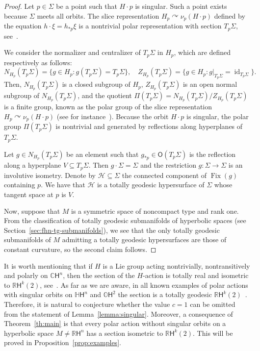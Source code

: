 \documentclass[12pt, a4paper]{amsart}
\newcommand{\s}{\mathsf}
\newcommand{\R}{\mathbb{R}}
\newcommand{\C}{\mathbb{C}}
\renewcommand{\H}{\mathbb{H}}
\renewcommand{\O}{\mathbb{O}}
\theoremstyle{definition}
\begin{document}
\begin{proof}
    Let $p\in \Sigma$ be a point such that $H\cdot p$ is singular.
    Such a point exists because $\Sigma$ meets all orbits.
    The slice representation $H_p \curvearrowright \nu_p (H\cdot p)$ defined 
    by the equation $h\cdot\xi=h_{*p}\xi$
    is a nontrivial polar representation with section $T_p\Sigma$, see~\cite{BerndtConsoleOlmos16}.

    We consider the normalizer and centralizer of $T_p \Sigma$ in $H_p$, which are defined respectively as follows:
    \begin{equation*}
        N_{H_p}(T_p\Sigma)=\{ g\in H_p \colon g(T_p\Sigma)=T_p\Sigma \}, \quad
        Z_{H_p}(T_p\Sigma)=\{ g\in H_p \colon g\vert_{T_p\Sigma}=\operatorname{id}_{T_p\Sigma} \}.
    \end{equation*}
    Then, $N_{H_p}(T_p\Sigma)$ is a closed subgroup of $H_p$, $Z_{H_p}(T_p\Sigma)$ is an open normal subgroup of $N_{H_p}(T_p\Sigma)$, and the quotient $\Pi(T_p\Sigma)=N_{H_p}(T_p\Sigma)/Z_{H_p}(T_p\Sigma)$ is a finite group, known as the polar group of the slice representation $H_p \curvearrowright \nu_p(H\cdot p)$
    (see for instance~\cite{GroveZiller}).
    Because the orbit $H\cdot p$ is singular, the polar group $\Pi(T_p\Sigma)$ is nontrivial and generated by reflections along hyperplanes of $T_p\Sigma$.

    Let $g\in N_{H_p}(T_p\Sigma)$ be an element such that $g_{*p}\in \s{O}(T_p\Sigma)$ is the reflection along a hyperplane $V\subseteq T_p\Sigma$.
    Then $g\cdot \Sigma = \Sigma$ and the restriction $g\colon \Sigma \to \Sigma$ is an involutive isometry.
    Denote by $\mathcal{H}\subseteq \Sigma$ the connected component of $\operatorname{Fix}(g)$ containing $p$.
    We have that $\mathcal{H}$ is a totally geodesic hypersurface of $\Sigma$ whose tangent space at $p$ is $V$.

    Now, suppose that $M$ is a symmetric space of noncompact type and rank one.
    From the classification of totally geodesic submanifolds of hyperbolic spaces (see Section~\ref{sec:fhn-tg-submanifolds}), we see that the only totally geodesic submanifolds of $M$ admitting a totally geodesic hypersurfaces are those of constant curvature, so the second claim follows. \qedhere
\end{proof}

It is worth mentioning that if $H$ is a Lie group acting nontrivially, nontransitively and polarly on $\C\s{H}^n$, then the section of the $H$-action is totally real and isometric to $\R\s{H}^{k}(2)$, see~\cite[Proposition~2.4]{DiazDominguezKollross20}.
As far as we are aware, in all known examples of polar actions with singular orbits on $\H\s{H}^n$ and $\O\s{H}^2$ the section is a totally geodesic $\R\s{H}^k(2)$~\cite{kollross-duality,kollross-octonions}.
Therefore, it is natural to conjecture whether the value $c=1$ can be omitted from the statement of Lemma~\ref{lemma:singular}.
Moreover, a consequence of Theorem~\ref{th:main} is that every polar action without singular orbits on a hyperbolic space $M\neq\R\s{H}^n$ has a section isometric to $\R\s{H}^k(2)$.
This will be proved in Proposition~\ref{prop:examples}.
\end{document}
